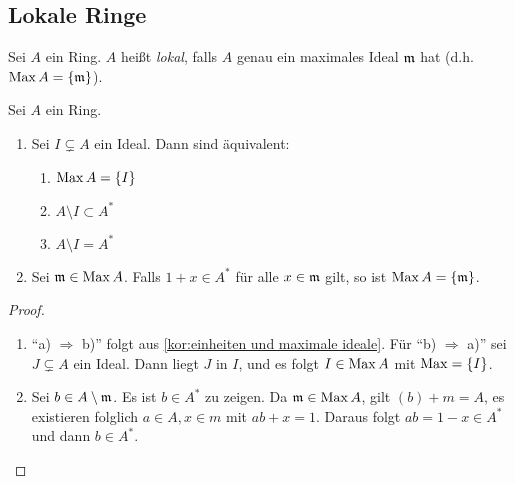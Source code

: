 \documentclass[12pt,a4paper]{scrartcl}
\theoremstyle{cplain}
\theoremstyle{cdef}
\begin{document}
\subsection{Lokale Ringe}
\begin{defi} \label{def1.5}
	Sei $A$ ein Ring. $A$ heißt \emph{lokal}, falls $A$ genau ein maximales Ideal $\mathfrak{m}$ hat (d.h. $\operatorname{Max} A = \{\mathfrak{m}\}$).
\end{defi}
\begin{lem} \label{lem:lokale ringe}
	Sei $A$ ein Ring.
	\begin{enumerate}
		\item Sei $I \subsetneq A$ ein Ideal. Dann sind äquivalent:
		      \begin{enumerate}
			      \item $\operatorname{Max} A = \{I\}$
			      \item $A \setminus I \subset A^*$
			      \item $A \setminus I = A^*$
		      \end{enumerate}
		\item Sei $\mathfrak{m} \in \operatorname{Max} A$. Falls $1+x \in A^*$ für alle $x \in \mathfrak{m}$ gilt, so ist $\operatorname{Max} A=\{ \mathfrak{m} \}$.
	\end{enumerate}
    \begin{proof}
        \leavevmode
		\begin{enumerate}
			\item \enquote{a) $\Rightarrow$ b)} folgt aus \cref{kor:einheiten und maximale ideale}. Für \enquote{b) $\Rightarrow$ a)} sei $J \subsetneq A$ ein Ideal. Dann liegt $J$ in $I$, und es folgt $I \in \operatorname{Max} A$ mit $\operatorname{Max} = \{I\}$.
			\item Sei $b \in A \setminus \mathfrak{m}$. Es ist $b \in A^*$ zu zeigen. Da $\mathfrak{m} \in \operatorname{Max} A$, gilt $(b)+m=A$, es existieren folglich $a \in A, x\in m$ mit $ab+x=1$. Daraus folgt $ab=1-x \in A^*$ und dann $b \in A^*$.
            \qedhere
        \end{enumerate}
	\end{proof}
\end{lem}
\end{document}
